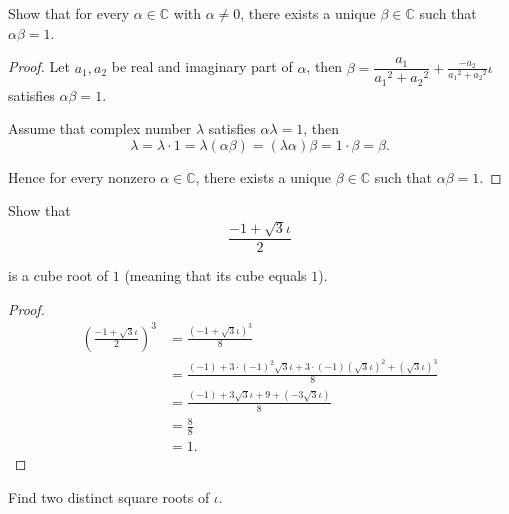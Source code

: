 \begin{exercise}
    Show that for every $\alpha\in\mathbb{C}$ with $\alpha\ne 0$, there exists a unique $\beta\in\mathbb{C}$ such that $\alpha\beta = 1$.
\end{exercise}

\begin{proof}
    Let $a_{1}, a_{2}$ be real and imaginary part of $\alpha$, then $\beta = \dfrac{a_{1}}{{a_{1}}^{2} + {a_{2}}^{2}} + \frac{-a_{2}}{{a_{1}}^{2} + {a_{2}}^{2}}\iota$ satisfies $\alpha\beta = 1$.

    Assume that complex number $\lambda$ satisfies $\alpha\lambda = 1$, then
    \[
        \lambda = \lambda\cdot 1 = \lambda(\alpha\beta) = (\lambda\alpha)\beta = 1\cdot\beta = \beta.
    \]

    Hence for every nonzero $\alpha\in\mathbb{C}$, there exists a unique $\beta\in\mathbb{C}$ such that $\alpha\beta = 1$.
\end{proof}

\begin{exercise}
    Show that
    \[
        \frac{-1 + \sqrt{3}\iota}{2}
    \]

    is a cube root of $1$ (meaning that its cube equals $1$).
\end{exercise}

\begin{proof}
    \begin{align*}
        {\left(\frac{-1 + \sqrt{3}\iota}{2}\right)}^{3} & = \frac{{(-1 + \sqrt{3}\iota)}^{3}}{8}                                                                      \\
                                                        & = \frac{(-1) + 3\cdot{(-1)}^{2}\sqrt{3}\iota + 3\cdot (-1){(\sqrt{3}\iota)}^{2} + {(\sqrt{3}\iota)}^{3}}{8} \\
                                                        & = \frac{(-1) + 3\sqrt{3}\iota + 9 + (-3\sqrt{3}\iota)}{8}                                                   \\
                                                        & = \frac{8}{8}                                                                                               \\
                                                        & = 1.
    \end{align*}
\end{proof}

\begin{exercise}
    Find two distinct square roots of $\iota$.
\end{exercise}

